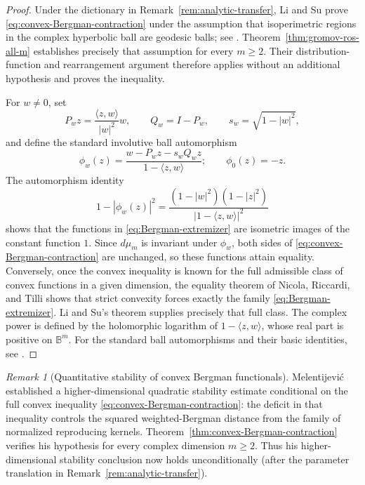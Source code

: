 \documentclass[11pt,reqno]{amsart}
\numberwithin{equation}{section}
\theoremstyle{definition}
\theoremstyle{remark}
\newtheorem{remark}[theorem]{Remark}
\begin{document}
\begin{proof}
Under the dictionary in Remark~\ref{rem:analytic-transfer}, Li and Su prove
\eqref{eq:convex-Bergman-contraction} under the assumption
that isoperimetric regions in the complex hyperbolic ball are geodesic
balls; see \cite[Theorem~1.7]{LiSu2025}.
Theorem~\ref{thm:gromov-ros-all-m} establishes precisely that assumption
for every \(m\ge2\). Their distribution-function
and rearrangement argument therefore applies without an additional
hypothesis and proves the inequality.

For \(w\ne0\), set
\[
P_wz=\frac{\langle z,w\rangle}{|w|^2}w,
\qquad
Q_w=I-P_w,
\qquad
s_w=\sqrt{1-|w|^2},
\]
and define the standard involutive ball automorphism
\[
\phi_w(z)
=
\frac{w-P_wz-s_wQ_wz}{1-\langle z,w\rangle};
\qquad
\phi_0(z)=-z.
\]
The automorphism identity
\[
 1-|\phi_w(z)|^2
 =\frac{(1-|w|^2)(1-|z|^2)}{|1-\langle z,w\rangle|^2}
\]
shows that the functions in \eqref{eq:Bergman-extremizer} are isometric
images of the constant function $1$.  Since $d\mu_m$ is invariant under
$\phi_w$, both sides of \eqref{eq:convex-Bergman-contraction} are unchanged,
so these functions attain equality.  Conversely, once the convex inequality
is known for the full admissible class of convex functions in a given
dimension, the equality theorem of Nicola, Riccardi, and Tilli
\cite[Theorem~5.2]{NicolaRiccardiTilli2025} shows that strict convexity
forces exactly the family \eqref{eq:Bergman-extremizer}.  Li and Su's theorem
supplies precisely that full class.  The
complex power is defined by the holomorphic logarithm of
$1-\langle z,w\rangle$, whose real part is positive on $\mathbb B^m$.
For the standard ball automorphisms and their basic identities, see
\cite[Chapter~2]{Zhu2005}.
\end{proof}

\begin{remark}[Quantitative stability of convex Bergman functionals]
Melentijevi\'c \cite[Theorem~4]{Melentijevic2025} established a
higher-dimensional quadratic stability estimate conditional on the full
convex inequality \eqref{eq:convex-Bergman-contraction}: the deficit in that
inequality controls the squared weighted-Bergman distance from the family of
normalized reproducing kernels.  Theorem~\ref{thm:convex-Bergman-contraction}
verifies his hypothesis for every complex dimension $m\ge2$.  Thus his
higher-dimensional stability conclusion now holds unconditionally (after
the parameter translation in Remark~\ref{rem:analytic-transfer}).
\end{remark}
\end{document}
